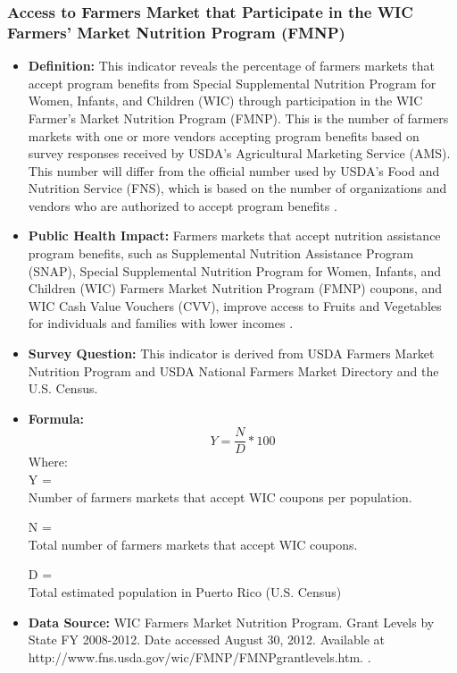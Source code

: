 \documentclass[12pt,letterpaper]{report}
\begin{document}
\subsubsection{Access to Farmers Market that Participate in the WIC Farmers' Market Nutrition Program (FMNP)} 
	\begin{itemize}
		\item \textbf{Definition:} This indicator reveals the percentage of farmers markets that accept program benefits from Special Supplemental Nutrition Program for Women, Infants, and Children (WIC) through participation in the WIC Farmer's Market Nutrition Program (FMNP). This is the number of farmers markets with one or more vendors accepting program benefits based on survey responses received by USDA’s Agricultural Marketing Service (AMS). This number will differ from the official number used by USDA’s Food and Nutrition Service (FNS), which is based on the number of organizations and vendors who are authorized to accept program benefits \cite{fruitandvegetable2013}. 
		\item \textbf{Public Health Impact:} Farmers markets that accept nutrition assistance program benefits, such as Supplemental Nutrition Assistance Program (SNAP), Special Supplemental Nutrition Program for Women, Infants, and Children (WIC) Farmers Market Nutrition Program (FMNP) coupons, and WIC Cash Value Vouchers (CVV), improve access to Fruits and Vegetables for individuals and families with lower incomes \cite{story2008creating} \cite{fox2004effects} \cite{kendall1996relationship} \cite{black2004special} \cite{dunifon2003influences}.
		\item \textbf{Survey Question:}
		This indicator is derived from USDA Farmers Market Nutrition Program and USDA National Farmers Market Directory and the U.S. Census.
		\item \textbf{Formula:} 
			\begin{equation}
				Y = \frac{N}{D} *100
			\end{equation}
Where: \\
			Y = \\ Number of farmers markets that accept WIC coupons per population.
			
			N = \\ Total number of farmers markets that accept WIC coupons. 
			
			D = \\ Total estimated population in Puerto Rico (U.S. Census)
			
		\item \textbf{Data Source:} WIC Farmers Market Nutrition Program. Grant Levels by State FY 2008-2012. Date accessed August 30, 2012. Available at http://www.fns.usda.gov/wic/FMNP/FMNPgrantlevels.htm. \cite{fruitandvegetable2013}.
	\end{itemize}
\end{document}
